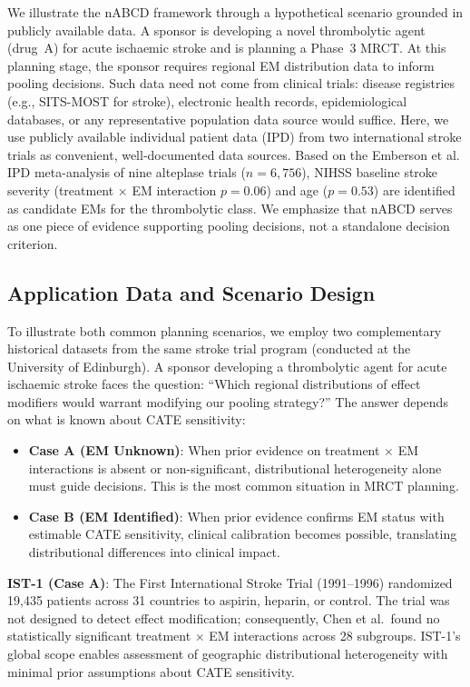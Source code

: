 \documentclass[AMA,Times1COL]{WileyNJDv5}
\begin{document}
We illustrate the nABCD framework through a hypothetical scenario grounded in publicly available data. A sponsor is developing a novel thrombolytic agent (drug~A) for acute ischaemic stroke and is planning a Phase~3 MRCT. At this planning stage, the sponsor requires regional EM distribution data to inform pooling decisions. Such data need not come from clinical trials: disease registries (e.g., SITS-MOST for stroke), electronic health records, epidemiological databases, or any representative population data source would suffice. Here, we use publicly available individual patient data (IPD) from two international stroke trials as convenient, well-documented data sources. Based on the Emberson et al.\cite{emberson2014} IPD meta-analysis of nine alteplase trials ($n = 6{,}756$), NIHSS baseline stroke severity (treatment $\times$ EM interaction $p = 0.06$) and age ($p = 0.53$) are identified as candidate EMs for the thrombolytic class. We emphasize that nABCD serves as one piece of evidence supporting pooling decisions, not a standalone decision criterion.

\subsection{Application Data and Scenario Design}\label{sec:app_scenario}

To illustrate both common planning scenarios, we employ two complementary historical datasets from the same stroke trial program (conducted at the University of Edinburgh). A sponsor developing a thrombolytic agent for acute ischaemic stroke faces the question: ``Which regional distributions of effect modifiers would warrant modifying our pooling strategy?'' The answer depends on what is known about CATE sensitivity:

\begin{itemize}
  \item \textbf{Case A (EM Unknown)}: When prior evidence on treatment $\times$ EM interactions is absent or non-significant, distributional heterogeneity alone must guide decisions. This is the most common situation in MRCT planning.
  \item \textbf{Case B (EM Identified)}: When prior evidence confirms EM status with estimable CATE sensitivity, clinical calibration becomes possible, translating distributional differences into clinical impact.
\end{itemize}

\noindent
\textbf{IST-1 (Case A)}: The First International Stroke Trial (1991--1996) randomized 19,435 patients across 31 countries to aspirin, heparin, or control.\cite{ist1_2000} The trial was not designed to detect effect modification; consequently, Chen et al.\ found no statistically significant treatment $\times$ EM interactions across 28 subgroups.\cite{chen2000} IST-1's global scope enables assessment of geographic distributional heterogeneity with minimal prior assumptions about CATE sensitivity.
\end{document}
